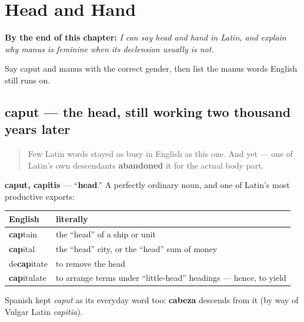 
\chapter{Head and Hand}
\label{ch:la-head-and-hand}

\begin{chapteropening}
\textbf{By the end of this chapter:} \emph{I can say head and hand in Latin, and explain why manus is feminine when its declension usually is not.}

Say caput and manus with the correct gender, then list the manus words English still runs on.
\end{chapteropening}

\section[caput]{caput — the head, still working two thousand years later}

\label{lesson:LA-C08-caput}



\begin{quote}
Few Latin words stayed as busy in English as this one. And yet — one of Latin's own descendants \textbf{abandoned} it for the actual body part.
\end{quote}

\begin{cousinweb}
\textbf{caput, capitis} — \textquotedblleft{}\textbf{head}.\textquotedblright{} A perfectly ordinary noun, and one of Latin's most productive exports:

\noindent
\begin{tabularx}{\linewidth}{@{}>{\raggedright\arraybackslash}X>{\raggedright\arraybackslash}X@{}}
\toprule
\textbf{English} & \textbf{literally} \\
\midrule
\textbf{cap}tain & the \textquotedblleft{}head\textquotedblright{} of a ship or unit \\
\textbf{cap}ital & the \textquotedblleft{}head\textquotedblright{} city, or the \textquotedblleft{}head\textquotedblright{} sum of money \\
de\textbf{cap}itate & to remove the head \\
\textbf{cap}itulate & to arrange terms under \textquotedblleft{}little-head\textquotedblright{} headings — hence, to yield \\
\bottomrule
\end{tabularx}

Spanish kept \emph{caput} as its everyday word too: \textbf{cabeza} descends from it (by way of Vulgar Latin \emph{capitia}).
\end{cousinweb}


